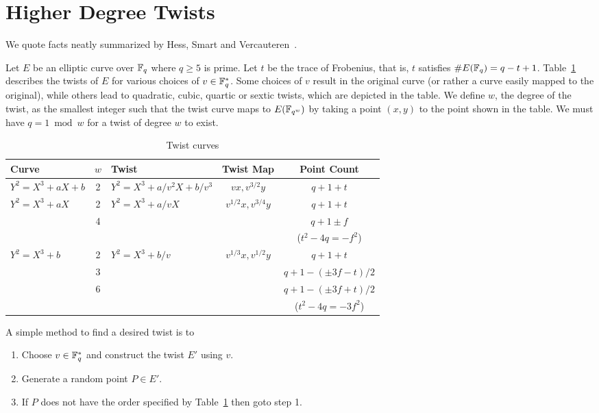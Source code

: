 \section {\label{sec:hightwists}Higher Degree Twists}

We quote facts neatly summarized by
Hess, Smart and Vercauteren~\cite{hsv}.

Let $E$ be an elliptic curve over $\mathbb{F}_q$ where $q\ge 5$ is prime.
Let $t$ be the trace of Frobenius, that is,
$t$ satisfies $\#E(\mathbb{F}_q) = q-t+1$.
Table~\ref{tbl:twistcurves}
describes the twists of $E$
for various choices of $v \in \mathbb{F}_q^*$.
Some choices of $v$ result in
the original curve (or rather a curve easily mapped to the original),
while others lead to quadratic, cubic, quartic or sextic twists, which are
depicted in the table.
We define $w$, the degree of the twist,
as the smallest integer such that the twist curve
maps to $E(\mathbb{F}_{q^w})$ by taking a point $(x,y)$ to the point shown in the table.
We must have $q = 1 \bmod w$ for a twist of degree $w$ to exist.

\begin{table}
\begin{center}
\begin{tabular}{|l|c|l|c|c|}

  \hline
  Curve & $w$ & Twist & Twist Map & Point Count \\
  \hline
  $Y^2 = X^3 + a X + b$ & 2 &
  $Y^2 = X^3 + a / v^2 X + b / v^3$ &
  $v x, v^{3/2} y$ &
  $q + 1 + t$ \\
  \hline
  $Y^2 = X^3 + a X$ & 2 &
  $Y^2 = X^3 + a / v X$ &
  $v^{1/2} x, v^{3/4} y$ &
  $q + 1 + t$ \\
  & 4 & & & $q + 1 \pm f$ \\
  & & & & ($t^2 - 4q = -f^2$) \\
  \hline
  $Y^2 = X^3 + b$ & 2 &
  $Y^2 = X^3 + b / v$ &
  $v^{1/3} x, v^{1/2} y$ &
  $q + 1 + t$ \\
  & 3 & & & $q + 1 - (\pm 3f - t)/2$ \\
  & 6 & & & $q + 1 - (\pm 3f + t)/2$ \\
  & & & & ($t^2 - 4q = - 3f^2$) \\
  \hline
\end{tabular}
\end{center}
\caption{\label{tbl:twistcurves}
    Twist curves
}
\end{table}

A simple method to find a desired twist is to

\begin{enumerate}
\item Choose $v \in \mathbb{F}_q^{*}$ and construct the twist $E'$ using $v$.
\item Generate a random point $P \in E'$.
\item If $P$ does not have the order specified by Table~\ref{tbl:twistcurves}
then goto step 1.
\end{enumerate}

